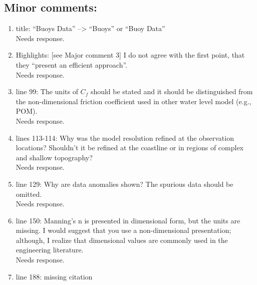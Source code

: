 \documentclass[]{article}
\newcommand{\alert}[1]{{\color{red} #1}}
\begin{document}
\subsection*{Minor comments:}
\begin{enumerate}
\item title: ``Buoys Data'' --> ``Buoys'' or ``Buoy Data''\\

\alert{Needs response.} \\

\item Highlights: [see Major comment 3] I do not agree with the first point, that they ``present an efficient approach''.\\

\alert{Needs response.} \\

\item line 99: The units of $C_f$ should be stated and it should be distinguished from the non-dimensional friction coefficient used in other water level model (e.g., POM).\\

\alert{Needs response.} \\

\item lines 113-114: Why was the model resolution refined at the observation locations? Shouldn't it be refined at the coastline or in regions of complex and shallow topography?\\

\alert{Needs response.} \\

\item line 129: Why are data anomalies shown? The spurious data should be omitted.\\

\alert{Needs response.} \\

\item line 150: Manning's n is presented in dimensional form, but the units are missing. I would suggest that you use a non-dimensional presentation; although, I realize that dimensional values are commonly used in the engineering literature.\\

\alert{Needs response.} \\

\item line 188: missing citation\\


\end{enumerate}
\end{document}
